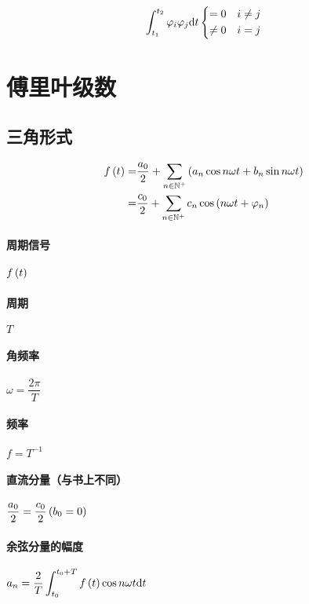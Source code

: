 \documentclass{article}
\begin{document}
\[\int_{t_1}^{t_2}\varphi_i\varphi_j\mathrm d t
    \left\{\begin{aligned}
        =0    &  & i\neq j \\
        \neq0 &  & i=j
    \end{aligned}\right.\]

\section{傅里叶级数}

\subsection{三角形式}

\[\begin{aligned}
        f\left(t\right)
        = & \frac{a_0}2+\sum_{n\in\mathbb N^+}\left(a_n\cos n\omega t+b_n\sin n\omega t\right) \\
        = & \frac{c_0}2+\sum_{n\in\mathbb N^+}c_n\cos\left(n\omega t+\varphi_n\right)
    \end{aligned}\]

\paragraph{周期信号}$f\left(t\right)$

\paragraph{周期}$T$

\paragraph{角频率}$\omega=\dfrac{2\pi}T$

\paragraph{频率}$f=T^{-1}$

\paragraph{直流分量（与书上不同）}$\dfrac{a_0}2=\dfrac{c_0}2\left(b_0=0\right)$

\paragraph{余弦分量的幅度}$\displaystyle a_n=\frac2T\int_{t_0}^{t_0+T}f\left(t\right)\cos n\omega t\mathrm d t$
\end{document}

